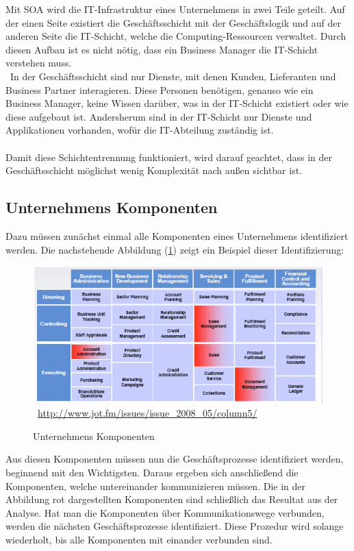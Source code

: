 Mit SOA wird die IT-Infrastruktur eines Unternehmens in zwei Teile geteilt. Auf der einen Seite existiert die Geschäftsschicht mit der Geschäftslogik und auf der anderen Seite die IT-Schicht, welche die Computing-Ressourcen verwaltet. Durch diesen Aufbau ist es nicht nötig, dass ein Business Manager die IT-Schicht verstehen muss.
\\\
In der Geschäftsschicht sind nur Dienste, mit denen Kunden, Lieferanten und Business Partner interagieren. Diese Personen benötigen, genauso wie ein Business Manager, keine Wissen darüber, was in der IT-Schicht existiert oder wie diese aufgebaut ist. Andersherum sind in der IT-Schicht nur Dienste und Applikationen vorhanden, wofür die IT-Abteilung zuständig ist.
\\\\
Damit diese Schichtentrennung funktioniert, wird darauf geachtet, dass in der Geschäftsschicht möglichst wenig Komplexität nach außen sichtbar ist.

\subsection{Unternehmens Komponenten}
\label{subsec:UnternehmensKomponenten}
Dazu müssen zunächst einmal alle Komponenten eines Unternehmens identifiziert werden. Die nachstehende Abbildung (\ref{fig:UnternehmensKomponenten}) zeigt ein Beispiel dieser Identifizierung:

\begin{figure}[htb]
    \centering 
    \includegraphics[width=\linewidth]{content/images/UnternehmensKomponenten}\
    \quelle\url{http://www.jot.fm/issues/issue_2008_05/column5/}
    \caption[Unternehmens Komponenten]{Unternehmens Komponenten\\}
    \label{fig:UnternehmensKomponenten}  
\end{figure} 
\newpage
Aus diesen Komponenten müssen nun die Geschäftsprozesse identifiziert werden, beginnend mit den Wichtigsten. Daraus ergeben sich anschließend die Komponenten, welche untereinander kommunizieren müssen. Die in der Abbildung rot dargestellten Komponenten sind schließlich das Resultat aus der Analyse. Hat man die Komponenten über Kommunikationswege verbunden, werden die nächsten Geschäftsprozesse identifiziert. Diese Prozedur wird solange wiederholt, bis alle Komponenten mit einander verbunden sind.

